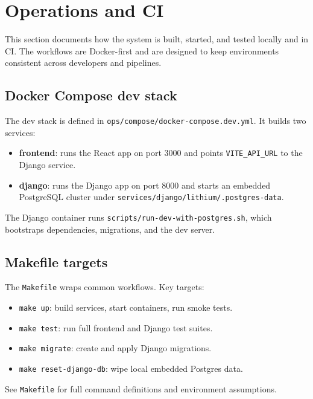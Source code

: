 \section{Operations and CI}
\label{sec:ops}

This section documents how the system is built, started, and tested locally and in CI. The workflows are Docker-first and are designed to keep environments consistent across developers and pipelines.

\subsection{Docker Compose dev stack}
\label{subsec:ops:compose}

The dev stack is defined in \texttt{ops/compose/docker-compose.dev.yml}. It builds two services:

\begin{itemize}
  \item \textbf{frontend}: runs the React app on port 3000 and points \texttt{VITE\_API\_URL} to the Django service.
  \item \textbf{django}: runs the Django app on port 8000 and starts an embedded PostgreSQL cluster under \texttt{services/django/lithium/.postgres-data}.
\end{itemize}

The Django container runs \texttt{scripts/run-dev-with-postgres.sh}, which bootstraps dependencies, migrations, and the dev server.

\subsection{Makefile targets}
\label{subsec:ops:make}

The \texttt{Makefile} wraps common workflows. Key targets:

\begin{itemize}
  \item \texttt{make up}: build services, start containers, run smoke tests.
  \item \texttt{make test}: run full frontend and Django test suites.
  \item \texttt{make migrate}: create and apply Django migrations.
  \item \texttt{make reset-django-db}: wipe local embedded Postgres data.
\end{itemize}

See \texttt{Makefile} for full command definitions and environment assumptions.


